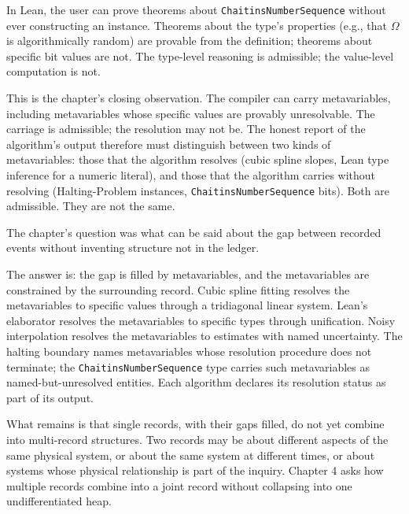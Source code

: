 In Lean, the user can prove theorems about
\texttt{ChaitinsNumberSequence} without ever constructing an instance.
Theorems about the type's properties (e.g., that $\Omega$ is
algorithmically random) are provable from the definition; theorems
about specific bit values are not. The type-level reasoning is
admissible; the value-level computation is not.

This is the chapter's closing observation. The compiler can carry
metavariables, including metavariables whose specific values are
provably unresolvable. The carriage is admissible; the resolution may
not be. The honest report of the algorithm's output therefore must
distinguish between two kinds of metavariables: those that the
algorithm resolves (cubic spline slopes, Lean type inference for a
numeric literal), and those that the algorithm carries without
resolving (Halting-Problem instances,
\texttt{ChaitinsNumberSequence} bits). Both are admissible. They are
not the same.

\begin{bridge}

The chapter's question was what can be said about the gap between
recorded events without inventing structure not in the ledger.

The answer is: the gap is filled by metavariables, and the metavariables
are constrained by the surrounding record. Cubic spline fitting resolves
the metavariables to specific values through a tridiagonal linear
system. Lean's elaborator resolves the metavariables to specific types
through unification. Noisy interpolation resolves the metavariables to
estimates with named uncertainty. The halting boundary names
metavariables whose resolution procedure does not terminate; the
\texttt{ChaitinsNumberSequence} type carries such metavariables as
named-but-unresolved entities. Each algorithm declares its resolution
status as part of its output.

What remains is that single records, with their gaps filled, do not yet
combine into multi-record structures. Two records may be about different
aspects of the same physical system, or about the same system at
different times, or about systems whose physical relationship is part
of the inquiry. Chapter 4 asks how multiple records combine into a
joint record without collapsing into one undifferentiated heap.

\end{bridge}

